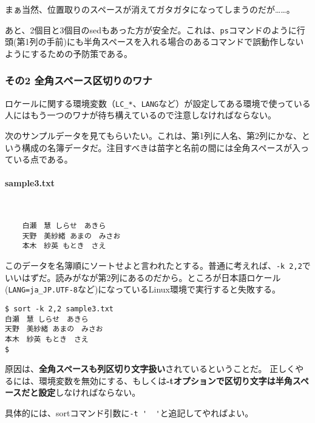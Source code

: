 まぁ当然、位置取りのスペースが消えてガタガタになってしまうのだが……。

あと、2個目と3個目のsedもあった方が安全だ。これは、\verb|ps|コマンドのように行頭(第1列の手前)にも半角スペースを入れる場合のあるコマンドで誤動作しないようにするための予防策である。

\subsubsection*{その2 全角スペース区切りのワナ}

ロケールに関する環境変数（\verb|LC_*|、\verb|LANG|など）が設定してある環境で使っている人にはもう一つのワナが待ち構えているので注意しなければならない。

次のサンプルデータを見てもらいたい。これは、第1列に人名、第2列にかな、という構成の名簿データだ。注目すべきは苗字と名前の間には全角スペースが入っている点である。

\paragraph{sample3.txt} 　\\
\begin{frameboxit}{160.0mm}
\begin{verbatim}
	白瀬　慧 しらせ　あきら
	天野　美紗緒 あまの　みさお
	本木　紗英 もとき　さえ
\end{verbatim}
\end{frameboxit}

このデータを名簿順にソートせよと言われたとする。普通に考えれば、\verb|-k 2,2|でいいはずだ。読みがなが第2列にあるのだから。ところが日本語ロケール(\verb|LANG=ja_JP.UTF-8|など)になっているLinux環境で実行すると失敗する。

\begin{screen}
	\verb!$ sort -k 2,2 sample3.txt! \return \\
	\verb!白瀬　慧 しらせ　あきら! \\
	\verb!天野　美紗緒 あまの　みさお! \\
	\verb!本木　紗英 もとき　さえ! \\
	\verb!$ !
\end{screen}

原因は、\textbf{全角スペースも列区切り文字扱い}されているということだ。
正しくやるには、環境変数を無効にする、もしくは\textbf{-tオプションで区切り文字は半角スペースだと設定}しなければならない。

具体的には、sortコマンド引数に\verb|-t '  '|と追記してやればよい。

